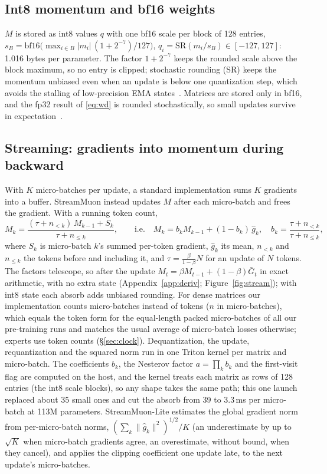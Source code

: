 \documentclass[10pt]{article}
\newcommand{\method}{StreamMuon}\newcommand{\lite}{StreamMuon-Lite}
\begin{document}
\subsection{Int8 momentum and bf16 weights}
\label{sec:int8}
\label{sec:sr}
$M$ is stored as int8 values $q$ with one bf16 scale per block of 128 entries,
$s_B=\mathrm{bf16}\big(\max_{i\in B}|m_i|\,(1+2^{-7})/127\big)$, $q_i=\mathrm{SR}(m_i/s_B)\in[-127,127]$: 1.016 bytes per
parameter. The factor $1+2^{-7}$ keeps the rounded scale above the block maximum, so no entry is clipped; stochastic
rounding (SR) keeps the momentum unbiased even when an update is below one quantization step, which avoids the
stalling of low-precision EMA states~\citep{topollai2026staleness}. Matrices are stored only in bf16, and the fp32 result
of \eqref{eq:wd} is rounded stochastically, so small updates survive in expectation~\citep{zamirai2020bf16,ozkara2025sr}.

\subsection{Streaming: gradients into momentum during backward}
\label{sec:stream}
With $K$ micro-batches per update, a standard implementation sums $K$ gradients into a buffer. \method{} instead updates
$M$ after each micro-batch and frees the gradient. With a running token count,
\begin{equation}
  M_k=\frac{(\tau+n_{<k})\,M_{k-1}+S_k}{\tau+n_{\le k}},\qquad\text{i.e.}\quad M_k=b_kM_{k-1}+(1-b_k)\,\hat g_k,\quad
  b_k=\frac{\tau+n_{<k}}{\tau+n_{\le k}},
  \label{eq:equal}
\end{equation}
where $S_k$ is micro-batch $k$'s summed per-token gradient, $\hat g_k$ its mean, $n_{<k}$ and $n_{\le k}$ the tokens
before and including it, and $\tau=\tfrac{\beta}{1-\beta}N$ for an update of $N$ tokens. The factors telescope, so after
the update $M_t=\beta M_{t-1}+(1-\beta)\bar G_t$ in exact arithmetic, with no extra state (Appendix~\ref{app:deriv};
Figure~\ref{fig:stream}); with int8 state each absorb adds unbiased rounding. For dense matrices our implementation
counts micro-batches instead of tokens ($n$ in micro-batches), which equals the token form for the equal-length
packed micro-batches of all our pre-training runs and matches the usual average of micro-batch losses otherwise;
experts use token counts (\S\ref{sec:clock}). Dequantization, the update, requantization and the squared norm run in one Triton kernel
per matrix and micro-batch. The coefficients $b_k$, the Nesterov factor $a=\prod_k b_k$ and the first-visit flag are
computed on the host, and the kernel treats each matrix as rows of 128 entries (the int8 scale blocks), so any shape
takes the same path; this one launch replaced about 35 small ones and cut the absorb from 39 to 3.3\,ms per micro-batch
at 113M parameters. \lite{} estimates the global gradient norm from per-micro-batch norms, $(\sum_k\|\hat g_k\|^2)^{1/2}/K$ (an
underestimate by up to $\sqrt K$ when micro-batch gradients agree, an overestimate, without bound, when they cancel), and applies the
clipping coefficient one update late, to the next update's micro-batches.
\end{document}
